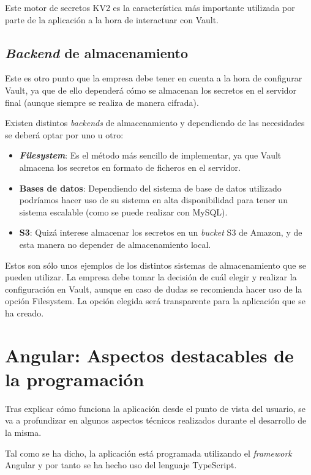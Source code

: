 \documentclass{\ClassPath/viu-tfm-template}
\begin{document}
Este motor de secretos KV2 es la característica más importante utilizada por parte de la aplicación a la hora de interactuar con Vault.

\hypertarget{backend_almacenamiento}{}
\subsection{\textit{Backend} de almacenamiento}

Este es otro punto que la empresa debe tener en cuenta a la hora de configurar Vault, ya que de ello dependerá cómo se almacenan los secretos en el servidor final (aunque siempre se realiza de manera cifrada).

Existen distintos \textit{backends} de almacenamiento y dependiendo de las necesidades se deberá optar por uno u otro:

\begin{itemize}
    \item \textbf{\textit{Filesystem}}: Es el método más sencillo de implementar, ya que Vault almacena los secretos en formato de ficheros en el servidor.
    \item \textbf{Bases de datos}: Dependiendo del sistema de base de datos utilizado podríamos hacer uso de su sistema en alta disponibilidad para tener un sistema escalable (como se puede realizar con MySQL).
    \item \textbf{S3}: Quizá interese almacenar los secretos en un \textit{bucket} S3 de Amazon, y de esta manera no depender de almacenamiento local.
\end{itemize}

Estos son sólo unos ejemplos de los distintos sistemas de almacenamiento que se pueden utilizar. La empresa debe tomar la decisión de cuál elegir y realizar la configuración en Vault, aunque en caso de dudas se recomienda hacer uso de la opción Filesystem. La opción elegida será transparente para la aplicación que se ha creado.


\section{Angular: Aspectos destacables de la programación}

Tras explicar cómo funciona la aplicación desde el punto de vista del usuario, se va a profundizar en algunos aspectos técnicos realizados durante el desarrollo de la misma.

Tal como se ha dicho, la aplicación está programada utilizando el \textit{framework} Angular y por tanto se ha hecho uso del lenguaje TypeScript.
\end{document}
